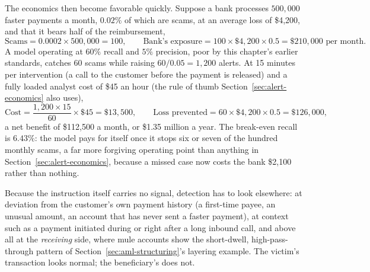 \documentclass[../ai_in_finance]{subfiles}
\begin{document}
The economics then become favorable quickly. Suppose a bank processes $500{,}000$ faster payments a month, $0.02\%$ of which are scams, at an average loss of \$4,200, and that it bears half of the reimbursement,
\begin{equation*}
\text{Scams} = 0.0002 \times 500{,}000 = 100, \qquad \text{Bank's exposure} = 100 \times \$4{,}200 \times 0.5 = \$210{,}000 \text{ per month}.
\end{equation*}
A model operating at $60\%$ recall and $5\%$ precision, poor by this chapter's earlier standards, catches 60 scams while raising $60/0.05 = 1{,}200$ alerts. At 15 minutes per intervention (a call to the customer before the payment is released) and a fully loaded analyst cost of \$45 an hour (the rule of thumb Section~\ref{sec:alert-economics} also uses),
\begin{equation*}
\text{Cost} = \frac{1{,}200 \times 15}{60} \times \$45 = \$13{,}500, \qquad \text{Loss prevented} = 60 \times \$4{,}200 \times 0.5 = \$126{,}000,
\end{equation*}
a net benefit of \$112,500 a month, or \$1.35 million a year. The break-even recall is $6.43\%$: the model pays for itself once it stops six or seven of the hundred monthly scams, a far more forgiving operating point than anything in Section~\ref{sec:alert-economics}, because a missed case now costs the bank \$2,100 rather than nothing.

Because the instruction itself carries no signal, detection has to look elsewhere: at deviation from the customer's own payment history (a first-time payee, an unusual amount, an account that has never sent a faster payment), at context such as a payment initiated during or right after a long inbound call, and above all at the \emph{receiving} side, where mule accounts show the short-dwell, high-pass-through pattern of Section~\ref{sec:aml-structuring}'s layering example. The victim's transaction looks normal; the beneficiary's does not.

\end{document}
